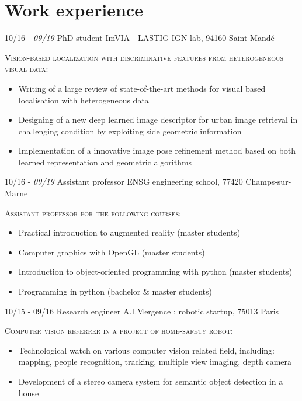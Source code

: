 \documentclass[]{friggeri-cv-cust}
\begin{document}
\section{Work experience}
\begin{entrylist}
  \entry
    {\small{10/16 - \textit{09/19}}}
    {PhD student}
    {ImVIA - LASTIG-IGN lab, 94160 Saint-Mandé}
    {\textsc{Vision-based localization with discriminative features from heterogeneous visual data:}
    \begin{itemize}[label=$\rhd$]
    	\item Writing of a large review of state-of-the-art methods for visual based localisation with heterogeneous data
        \item Designing of a new deep learned image descriptor for urban image retrieval in challenging condition by exploiting side geometric information
        \item Implementation of a innovative image pose refinement method based on both learned representation and geometric algorithms
    \end{itemize}
    }
  \entry
    {\small{10/16 - \textit{09/19}}}
    {Assistant professor}
    {ENSG engineering school, 77420 Champs-sur-Marne}
    {\textsc{Assistant professor for the following courses:}
    \begin{itemize}[label=$\rhd$]
        \item Practical introduction to augmented reality (master students)
        \item Computer graphics with OpenGL (master students)
   		\item Introduction to object-oriented programming with python (master students)
        \item Programming in python (bachelor \& master students)
    \end{itemize}
    }
  \entry
    {\small{10/15 - 09/16}}
    {Research engineer}
    {A.I.Mergence : robotic startup, 75013 Paris}
    {\textsc{Computer vision referrer in a project of home-safety robot:}
    \begin{itemize}[label=$\rhd$]
    	\item Technological watch on various computer vision related field, including: mapping, people recognition, tracking, multiple view imaging, depth camera
    	\item Development of a stereo camera system for semantic object detection in a house

\end{itemize}}
\end{entrylist}
\end{document}
